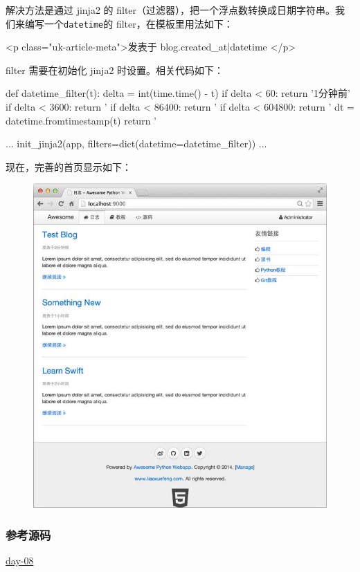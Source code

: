 解决方法是通过 jinja2 的
filter（过滤器），把一个浮点数转换成日期字符串。我们来编写一个\texttt{datetime}的
filter，在模板里用法如下：

\begin{pythoncode}
<p class="uk-article-meta">发表于{{ blog.created_at|datetime }}</p>
\end{pythoncode}

filter 需要在初始化 jinja2 时设置。相关代码如下：

\begin{pythoncode}
def datetime_filter(t):
    delta = int(time.time() - t)
    if delta < 60:
        return '1分钟前'
    if delta < 3600:
        return '%
    if delta < 86400:
        return '%
    if delta < 604800:
        return '%
    dt = datetime.fromtimestamp(t)
    return '%

...
init_jinja2(app, filters=dict(datetime=datetime_filter))
...
\end{pythoncode}

现在，完善的首页显示如下：

 
 \begin{figure}[htp]
	\centering
	\includegraphics[width=0.6\linewidth]{fig/955626563299584.png}
\end{figure}


\hypertarget{ux53c2ux8003ux6e90ux7801}{%
\subsubsection{参考源码}\label{ux53c2ux8003ux6e90ux7801}}

\href{https://github.com/michaelliao/awesome-python3-webapp/tree/day-08}{day-08}

